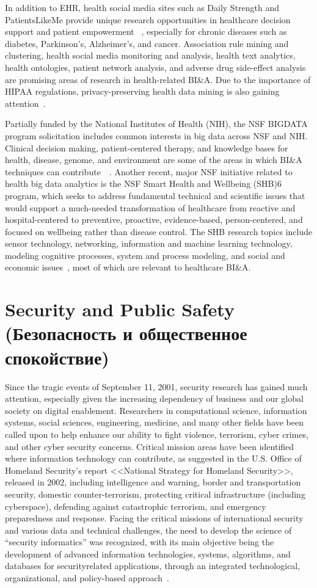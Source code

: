 In addition to EHR, health social media sites such as Daily
Strength and PatientsLikeMe provide unique research opportunities
in healthcare decision support and patient empowerment
~\cite{Miller:2012b}, especially for chronic diseases such as
diabetes, Parkinson’s, Alzheimer’s, and cancer. Association
rule mining and clustering, health social media monitoring
and analysis, health text analytics, health ontologies, patient
network analysis, and adverse drug side-effect analysis are
promising areas of research in health-related BI\&A. Due to
the importance of HIPAA regulations, privacy-preserving
health data mining is also gaining attention~\cite{Gelfand:2012}.

Partially funded by the National Institutes of Health (NIH),
the NSF BIGDATA program solicitation includes common
interests in big data across NSF and NIH. Clinical decision
making, patient-centered therapy, and knowledge bases for
health, disease, genome, and environment are some of the
areas in which BI\&A techniques can contribute~\cite{Chen:2011b}~\cite{Wactlar:2011}. Another recent, major NSF initiative
related to health big data analytics is the NSF Smart Health
and Wellbeing (SHB)6
program, which seeks to address
fundamental technical and scientific issues that would support
a much-needed transformation of healthcare from reactive and
hospital-centered to preventive, proactive, evidence-based,
person-centered, and focused on wellbeing rather than disease
control. The SHB research topics include sensor technology,
networking, information and machine learning technology,
modeling cognitive processes, system and process modeling,
and social and economic issues~\cite{Wactlar:2011}, most of
which are relevant to healthcare BI\&A.

\section{Security and Public Safety (Безопасность и общественное спокойствие)}
Since the tragic events of September 11, 2001, security
research has gained much attention, especially given the
increasing dependency of business and our global society on
digital enablement. Researchers in computational science,
information systems, social sciences, engineering, medicine,
and many other fields have been called upon to help enhance
our ability to fight violence, terrorism, cyber crimes, and other
cyber security concerns. Critical mission areas have been
identified where information technology can contribute, as
suggested in the U.S. Office of Homeland Security’s report
<<National Strategy for Homeland Security>>, released in 2002,
including intelligence and warning, border and transportation
security, domestic counter-terrorism, protecting critical infrastructure
(including cyberspace), defending against catastrophic
terrorism, and emergency preparedness and response.
Facing the critical missions of international security and
various data and technical challenges, the need to develop the
science of “security informatics” was recognized, with its
main objective being the development of advanced information technologies, systems, algorithms, and databases for securityrelated applications, through an integrated technological,
organizational, and policy-based approach~\cite{Chen:2006}.


